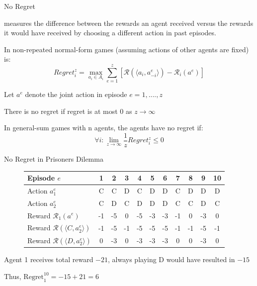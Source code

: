 \begin{frame}{No Regret}

 measures the difference between the rewards an agent received versus the rewards it would have received by choosing a different action in past episodes. 
\blist
	\item In non-repeated normal-form games (assuming actions of other agents are fixed)  is:
	\begin{equation*}
	    Regret_i^{z} = \max_{a_i \in A_i}\sum_{e = 1}^z\left[\mathcal{R}(\langle a_i, a_{-i}^{e}\rangle) - \mathcal{R}_i (a^e) \right]
	\end{equation*}
    \item Let \(a^e\) denote the joint action in episode \(e = 1, ...., z\)
    \item There is no regret if regret is at most 0 as $z \to \infty$ 
    \item  In general-sum games with n agents, the agents have no regret if:
    $$\forall i: \lim_{z \to \infty} \frac{1}{z}Regret_{i}^{z} \le 0$$
\elist

\end{frame}

\begin{frame}{No Regret in Prisoners Dilemma}

\begin{figure}[t]
	\centering
	\begin{tabular}{@{} l c c c c c c c c c c @{}}
		\toprule
		Episode $e$ \hspace{5em} 					  & 1 & 2 & 3 & 4 & 5 & 6 & 7 & 8 & 9 & 10 \\
		\midrule
		Action $a^e_1$  			 						 &  C &  C & D  & C  &  D  & D  &  C & D  & D & D \\
		Action $a^e_2$  			 						&  C &  D & C  & D  &  D  & D  &  C & C  & D & C \\
		Reward $\mathcal{R}_1(a^e)$						 & -1 & -5 & 0  & -5 & -3 & -3 & -1 & 0 & -3 & 0 \\
		\midrule
		Reward $\mathcal{R}(\langle C, a^e_2\rangle)$	& -1 & -5 & -1 & -5 & -5 & -5 & -1 & -1 & -5 & -1 \\
		Reward $\mathcal{R}(\langle D, a^e_2\rangle)$	&  0 & -3 & 0 & -3  & -3 & -3 & 0  & 0 & -3 & 0 \\
		\bottomrule
	\end{tabular}
 \end{figure}

 \blist
    \item Agent 1 receives total reward \(-21\), always playing D would have resulted in \(-15\) 
    \item Thus, \(\text{Regret}_{1}^{10} = -15 + 21 = 6\)
 \elist
    
\end{frame}

